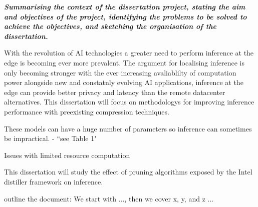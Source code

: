 \documentclass[../D1.tex]{subfiles}
\begin{document}
\emph{\textbf{Summarising the context of the dissertation project, stating the aim and objectives of the project, 
identifying the problems to be solved to achieve the objectives, and sketching the organisation of the dissertation.}}

With the revolution of AI technologies a greater need to perform inference at the edge is becoming ever more prevalent. The argument for localising inference is only becoming stronger with the ever increasing avaliablilty of computation power alongside new and constatnly evolving AI applications, inference at the edge can provide better privacy and latency than the remote datacenter alternatives.  
This dissertation will focus on methodologys for improving inference performance with preexisting compression techniques.

These models can have a huge number of parameters so inference can sometimes be impractical.
\autocite{chenDeepLearningMobile2020} - ``see Table 1"

Issues with limited resource computation \autocite{szeEfficientProcessingDeep2017}

This dissertation will study the effect of pruning algorithms exposed by the Intel distiller framework on inference.

outline the document: We start with ..., then we cover x, y, and z ...
\end{document}

